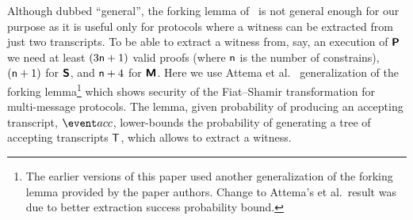 %

Although dubbed ``general'', the forking lemma of~\cite{CCS:BelNev06} is not general
enough for our purpose as it is useful only for protocols where a witness can be
extracted from just two transcripts. To be able to extract a witness from, say, an
execution of $\bm{\mathsf{P}}$ we need at least $(3 \mathsf{n} + 1)$ valid proofs
(where $\mathsf{n}$ is the number of constrains),
$(\mathsf{n}+ 1)$ for $\bm{\mathsf{S}}$, and $\mathsf{n} + 4$ for $\bm{\mathsf{M}}$. Here we use Attema et
al.~\cite{EPRINT:AttFehKlo21} generalization of the forking lemma\footnote{The
	earlier versions of this paper used another generalization of the forking lemma
	provided by the paper authors. Change to Attema's et al.~result was due to better
	extraction success probability bound.}  which shows security of the Fiat--Shamir
transformation for multi-message protocols. The lemma, given probability of producing
an accepting transcript, $\accProb$, lower-bounds the probability of generating a
tree of accepting transcripts $\mathsf{T}$, which allows to extract a witness.

